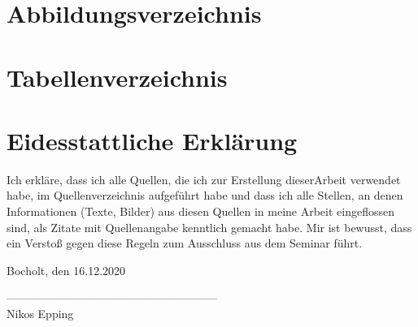 \documentclass[12pt,ngerman,a4paper,parskip]{scrartcl}
\begin{document}



\newpage

\tableofcontents

\newpage















\appendix

\newpage

\newpage


\section{Abbildungsverzeichnis}
\vspace{-2cm}
\renewcommand{\listfigurename}{}
\listoffigures

\section{Tabellenverzeichnis}
\vspace{-2cm}
\renewcommand{\listtablename}{}
\listoftables



\newpage
\section{Eidesstattliche Erklärung}
Ich erkläre, dass ich alle Quellen, die ich zur Erstellung dieserArbeit verwendet habe, im Quellenverzeichnis aufgeführt habe und dass ich alle Stellen, an denen Informationen (Texte, Bilder) aus diesen Quellen in meine Arbeit eingeflossen sind, als Zitate mit Quellenangabe kenntlich gemacht habe.
Mir ist bewusst, dass ein Verstoß gegen diese Regeln zum Ausschluss aus dem Seminar führt.

\vspace{1.5cm}

\small
Bocholt, den 16.12.2020

\vspace{0.8cm}

--------------------------------------------------------\\
Nikos Epping
\end{document}
